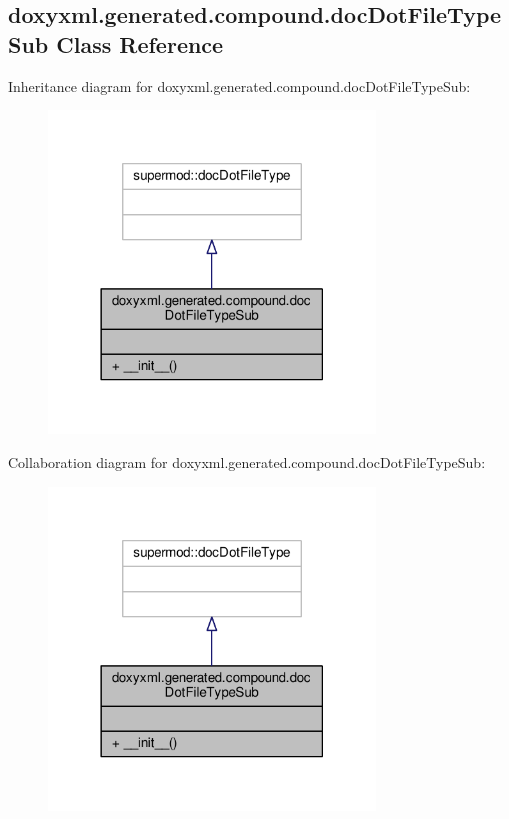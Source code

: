 \subsection{doxyxml.\+generated.\+compound.\+doc\+Dot\+File\+Type\+Sub Class Reference}
\label{classdoxyxml_1_1generated_1_1compound_1_1docDotFileTypeSub}


Inheritance diagram for doxyxml.\+generated.\+compound.\+doc\+Dot\+File\+Type\+Sub\+:
\nopagebreak
\begin{figure}[H]
\begin{center}
\leavevmode
\includegraphics[width=246pt]{d0/ddc/classdoxyxml_1_1generated_1_1compound_1_1docDotFileTypeSub__inherit__graph}
\end{center}
\end{figure}


Collaboration diagram for doxyxml.\+generated.\+compound.\+doc\+Dot\+File\+Type\+Sub\+:
\nopagebreak
\begin{figure}[H]
\begin{center}
\leavevmode
\includegraphics[width=246pt]{d4/dc2/classdoxyxml_1_1generated_1_1compound_1_1docDotFileTypeSub__coll__graph}
\end{center}
\end{figure}
